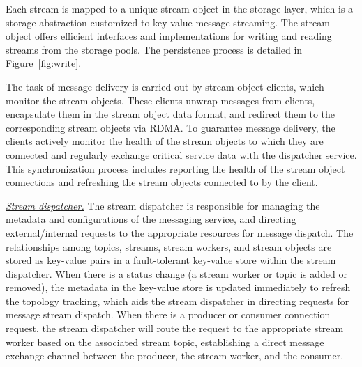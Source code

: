 Each stream is mapped to a unique stream object in the storage layer, which is a  storage abstraction customized to  key-value message streaming. The stream object offers efficient interfaces and implementations for writing and reading streams from the storage pools. The persistence process is detailed in Figure~\ref{fig:write}.

The task of message delivery is carried out by stream object clients, which monitor the stream objects. These clients unwrap messages from clients, encapsulate them in the stream object data format, and redirect them to the corresponding stream objects via RDMA. To guarantee message delivery, the clients actively monitor the health of the stream objects to which they are connected and regularly exchange critical service data with the dispatcher service. This synchronization process includes reporting the health of the stream object connections and refreshing the stream objects connected to by the client.


\noindent\underline{\textit{Stream dispatcher.}} The stream dispatcher is responsible for managing the metadata and configurations of the messaging service, and directing external/internal requests to the appropriate resources for message  dispatch. The relationships among topics, streams, stream workers, and stream objects are stored as key-value pairs in a fault-tolerant key-value store within the stream dispatcher. When there is  a status change   (\eg a stream worker or topic is added or removed), the metadata  in the key-value store is updated immediately to refresh the topology tracking, which aids the stream dispatcher in directing requests for message stream dispatch. When there is a producer or consumer connection request, the stream dispatcher will route the request to the appropriate stream worker based on the associated stream topic, establishing a direct message exchange channel between the producer, the stream worker, and the consumer.

